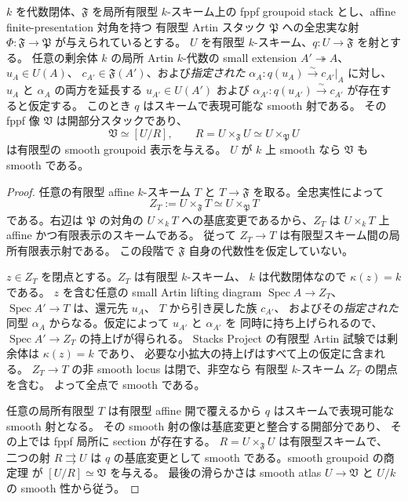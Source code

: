 \begin{lemma}
\label{lem:pointed-artin-lifting-smooth-bridge}
$k$ を代数閉体、$\mathfrak F$ を局所有限型 $k$-スキーム上の
fppf groupoid stack とし、affine finite-presentation 対角を持つ
有限型 Artin スタック $\mathfrak P$ への全忠実な射
$\Phi:\mathfrak F\to\mathfrak P$ が与えられているとする。
$U$ を有限型 $k$-スキーム、$q:U\to\mathfrak F$ を射とする。
任意の剰余体 $k$ の局所 Artin $k$-代数の small extension
$A'\twoheadrightarrow A$、$u_A\in U(A)$、
$c_{A'}\in\mathfrak F(A')$、および\emph{指定された}
$\alpha_A:q(u_A)\xrightarrow{\sim}c_{A'}|_A$ に対し、
$u_A$ と $\alpha_A$ の両方を延長する
$u_{A'}\in U(A')$ および
$\alpha_{A'}:q(u_{A'})\xrightarrow{\sim}c_{A'}$
が存在すると仮定する。
このとき $q$ はスキームで表現可能な smooth 射である。
その fppf 像 $\mathfrak V$ は開部分スタックであり、
\[
 \mathfrak V\simeq[U/R],\qquad
 R=U\times_{\mathfrak F}U
   \simeq U\times_{\mathfrak P}U
\]
は有限型の smooth groupoid 表示を与える。
$U$ が $k$ 上 smooth なら $\mathfrak V$ も smooth である。
\end{lemma}
\begin{proof}
任意の有限型 affine $k$-スキーム $T$ と
$T\to\mathfrak F$ を取る。全忠実性によって
\[
 Z_T:=U\times_{\mathfrak F}T
 \simeq U\times_{\mathfrak P}T
\]
である。右辺は $\mathfrak P$ の対角の
$U\times_kT$ への基底変更であるから、$Z_T$ は
$U\times_kT$ 上 affine かつ有限表示のスキームである。
従って $Z_T\to T$ は有限型スキーム間の局所有限表示射である。
この段階で $\mathfrak F$ 自身の代数性を仮定していない。

$z\in Z_T$ を閉点とする。$Z_T$ は有限型 $k$-スキーム、
$k$ は代数閉体なので $\kappa(z)=k$ である。
$z$ を含む任意の small Artin lifting diagram
$\operatorname{Spec}A\to Z_T$、
$\operatorname{Spec}A'\to T$ は、還元先 $u_A$、
$T$ から引き戻した族 $c_{A'}$、
およびその\emph{指定された}同型 $\alpha_A$
からなる。仮定によって $u_{A'}$ と $\alpha_{A'}$ を
同時に持ち上げられるので、$\operatorname{Spec}A'\to Z_T$
の持上げが得られる。
Stacks Project \cite[Tag 02HY, Lemma 37.12.2]{StacksSmoothAtlas}
の有限型 Artin 試験では剰余体は $\kappa(z)=k$ であり、
必要な小拡大の持上げはすべて上の仮定に含まれる。
$Z_T\to T$ の非 smooth locus は閉で、非空なら
有限型 $k$-スキーム $Z_T$ の閉点を含む。
よって全点で smooth である。

任意の局所有限型 $T$ は有限型 affine 開で覆えるから
$q$ はスキームで表現可能な smooth 射となる。
その smooth 射の像は基底変更と整合する開部分であり、
その上では fppf 局所に section が存在する。
$R=U\times_{\mathfrak F}U$ は有限型スキームで、
二つの射 $R\rightrightarrows U$ は $q$ の基底変更として
smooth である。smooth groupoid の商定理
\cite[Tags 04X0, 04TK]{StacksSmoothAtlas} が
$[U/R]\simeq\mathfrak V$ を与える。
最後の滑らかさは smooth atlas $U\to\mathfrak V$ と
$U/k$ の smooth 性から従う。
\end{proof}

